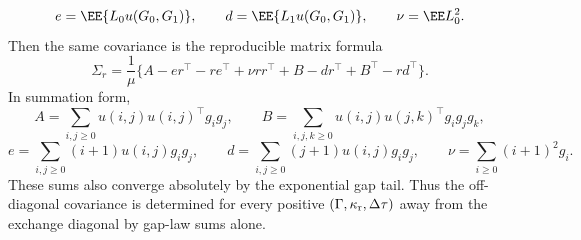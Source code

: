 \begin{lemma}
\[\]
\[
e=\EE\{L_0u(G_0,G_1)\},\qquad
d=\EE\{L_1u(G_0,G_1)\},\qquad
\nu=\EE L_0^2 .
\]
Then the same covariance is the reproducible matrix formula
\begin{equation}\label{eq:off-diagonal-inclusion-covariance-ABednu-main}
\Sigma_r
=\frac1\mu\{A-er^\top-re^\top+\nu rr^\top
+B-dr^\top+B^\top-rd^\top\}.
\end{equation}
In summation form,
\[
A=\sum_{i,j\ge0}u(i,j)u(i,j)^\top g_i g_j,\qquad
B=\sum_{i,j,k\ge0}u(i,j)u(j,k)^\top g_i g_j g_k,
\]
\[
e=\sum_{i,j\ge0}(i+1)u(i,j)g_i g_j,\qquad
d=\sum_{i,j\ge0}(j+1)u(i,j)g_i g_j,\qquad
\nu=\sum_{i\ge0}(i+1)^2g_i .
\]
These sums also converge absolutely by the exponential gap tail.  Thus the
off-diagonal covariance is determined for every positive
\((\Gamma,\kappa_{\rm r},\Delta\tau)\) away from the exchange diagonal by
gap-law sums alone.
\end{lemma}

